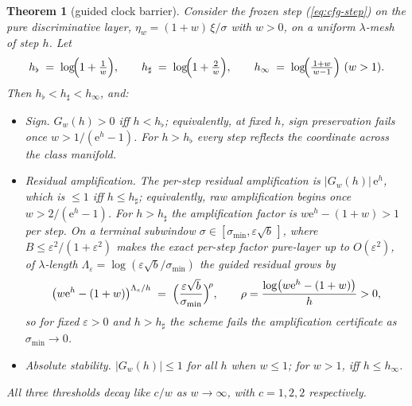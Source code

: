 \documentclass{article} %
\def\eqref#1{equation~\ref{#1}}
\theoremstyle{plain}
\newtheorem{theorem}{Theorem}
\theoremstyle{definition}
\theoremstyle{remark}
\providecommand{\eexp}{\mathrm{e}}
\providecommand{\smin}{\sigma_{\min}}
\providecommand{\etaw}{\eta_{w}}
\def\eqref#1{(\ref{#1})}
\newif\ifarxiv
\begin{document}
\begin{theorem}[guided clock barrier]\label{thm:gbarrier}
Consider the frozen step \eqref{eq:cfg-step} on the pure discriminative
layer, $\etaw = (1+w)\,\xi/\sigma$ with $w > 0$, on a uniform
$\lambda$-mesh of step $h$. Let
\begin{equation}\label{eq:thresholds}
  h_\flat \;=\; \log\!\Bigl(1+\tfrac1w\Bigr),
  \qquad
  h_\sharp \;=\; \log\!\Bigl(1+\tfrac2w\Bigr),
  \qquad
  h_\infty \;=\; \log\!\Bigl(\tfrac{1+w}{\,w-1\,}\Bigr)\ (w>1).
\end{equation}
Then $h_\flat < h_\sharp < h_\infty$, and:
\begin{itemize}
\item[(a)] \emph{Sign.} $G_w(h) > 0$ iff $h < h_\flat$; equivalently, at
fixed $h$, sign preservation fails once $w > 1/(\eexp^{h}-1)$. For $h >
h_\flat$ every step reflects the coordinate across the class manifold.
\item[(b)] \emph{Residual amplification.} The per-step residual
amplification is $|G_w(h)|\,\eexp^{h}$, which is $\le 1$ iff $h \le
h_\sharp$; equivalently, raw amplification begins once $w >
2/(\eexp^{h}-1)$. For $h > h_\sharp$ the amplification factor is
$w\eexp^{h} - (1+w) > 1$ per step. On a terminal subwindow
$\sigma \in [\smin, \varepsilon\sqrt b\,]$, where $B \le \varepsilon^2/(1+\varepsilon^2)$
makes the exact per-step factor pure-layer up to $O(\varepsilon^2)$, of
$\lambda$-length $\Lambda_\varepsilon = \log(\varepsilon\sqrt b/\smin)$ the guided
residual grows by
\begin{equation}\label{eq:blowup}
  \bigl(w\eexp^{h}-(1+w)\bigr)^{\Lambda_\varepsilon/h}
  \;=\;
  \Bigl(\frac{\varepsilon\sqrt b}{\smin}\Bigr)^{\!\rho},
  \qquad
  \rho = \frac{\log\bigl(w\eexp^{h}-(1+w)\bigr)}{h} > 0 ,
\end{equation}
so for fixed $\varepsilon>0$ and $h > h_\sharp$ the scheme fails the amplification
certificate as $\smin \to 0$.
\item[(c)] \emph{Absolute stability.} $|G_w(h)| \le 1$ for all $h$ when $w
\le 1$; for $w > 1$, iff $h \le h_\infty$.
\end{itemize}
All three thresholds decay like $c/w$ as $w \to \infty$, with $c = 1, 2,
2$ respectively.
\end{theorem}

\newcommand{\ProofGBarrier}{%
From \eqref{eq:Gw}: $G_w > 0 \iff \eexp^{-h} > w/(1+w) \iff h <
\log(1+1/w)$, which is (a). For (b), on the pure layer $\etaw \propto
\xi/\sigma$, so the residual ratio per step is $|\xi_{n+1}/\xi_n| \cdot
\sigma_n/\sigma_{n+1} = |G_w|\eexp^{h}$. On the branch $G_w \le 0$ this is
$(w - (1+w)\eexp^{-h})\eexp^{h} = w\eexp^{h} - (1+w)$, which exceeds $1$
iff $\eexp^{h} > 1 + 2/w$; on the branch $G_w \ge 0$ it equals $(1+w) -
w\eexp^{h} \le 1$ always. Compounding over $\Lambda_\varepsilon/h$ steps gives
\eqref{eq:blowup}. For (c), $G_w \le 1$ always, and $G_w \ge -1 \iff
(1+w)\eexp^{-h} \ge w-1$, vacuous for $w \le 1$ and equivalent to $h \le
h_\infty$ otherwise. The ordering $h_\sharp < h_\infty$ follows from
$\frac{1+w}{w-1} - \bigl(1+\frac2w\bigr) = \frac{2}{w(w-1)} > 0$.
}
\ifarxiv\begin{proof}\ProofGBarrier\end{proof}\fi
\end{document}
